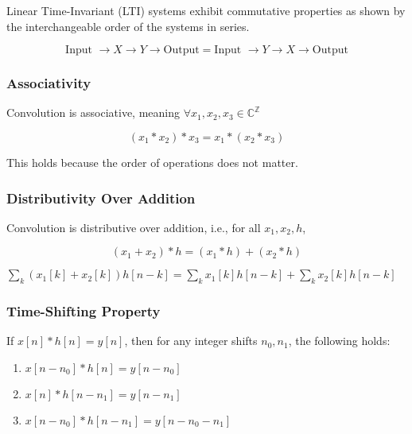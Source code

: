 \begin{intuition}
Linear Time-Invariant (LTI) systems exhibit commutative properties as shown by the interchangeable order of the systems in series.

\[
\text{Input } \to X \to Y \to \text{Output} = \text{Input } \to Y \to X \to \text{Output}
\]
\end{intuition}
    
\subsubsection{Associativity}
\begin{definition}
Convolution is associative, meaning $\forall x_1,x_2,x_3 \in \mathbb{C}^{\mathbb{Z}}$

\begin{equation}
(x_1 * x_2) * x_3 = x_1 * (x_2 * x_3)
\end{equation}

This holds because the order of operations does not matter.
\end{definition}

\subsubsection{Distributivity Over Addition}
\begin{definition}
Convolution is distributive over addition, i.e., for all \(x_1, x_2, h\),

\begin{equation}
(x_1 + x_2) * h = (x_1 * h) + (x_2 * h)
\end{equation}
\end{definition}

\begin{derivation}
    $\sum_k (x_1[k] + x_2[k]) h[n-k] = \sum_k x_1[k] h[n-k] + \sum_k x_2[k] h[n-k]$
\end{derivation}
    
\subsubsection{Time-Shifting Property}
\begin{definition}
If \(x[n] * h[n] = y[n]\), then for any integer shifts \(n_0, n_1\), the following holds:

\begin{enumerate}
    \item \(x[n - n_0] * h[n] = y[n - n_0]\)
    \item \(x[n] * h[n - n_1] = y[n - n_1]\)
    \item \(x[n - n_0] * h[n - n_1] = y[n - n_0 - n_1]\)
\end{enumerate}
\end{definition}

